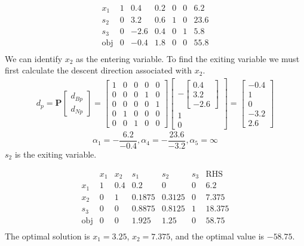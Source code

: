 \documentclass[11pt]{article}
\begin{document}
\begin{center}
\begin{center}
\[\begin{array}{c|ccccc|c}
      x_1 & 1 & 0.4 & 0.2 & 0 & 0 & 6.2 \\
      s_2 & 0 & 3.2 & 0.6 & 1 & 0 & 23.6 \\
      s_3 & 0 & -2.6 & 0.4 & 0 & 1 & 5.8 \\
      \hline
      \text{obj} & 0 & -0.4 & 1.8 & 0 & 0 & 55.8 \\
    \end{array}
    \]
    We can identify $x_2$ as the entering variable.
    To find the exiting variable we must first calculate the descent direction associated with $x_2$.
    \begin{align*}
      d_p =\textbf{P}
      \begin{bmatrix}
         d_{Bp} \\ d_{Np}
      \end{bmatrix}
      = 
      \begin{bmatrix}
        1 & 0 & 0 & 0 & 0 \\
        0 & 0 & 0 & 1 & 0 \\
        0 & 0 & 0 & 0 & 1 \\
        0 & 1 & 0 & 0 & 0 \\
        0 & 0 & 1 & 0 & 0
      \end{bmatrix}
      \begin{bmatrix}
        -
        \begin{bmatrix}
          0.4 \\ 3.2 \\ -2.6
        \end{bmatrix} \\
        1 \\ 0
      \end{bmatrix}
      =
      \begin{bmatrix}
        -0.4 \\ 1 \\ 0 \\ -3.2 \\ 2.6
      \end{bmatrix}
    \end{align*}
    \[
      \alpha_1 = -\frac{6.2}{-0.4} , \alpha_4 = -\frac{23.6}{-3.2}, \alpha_5 = \infty
    \]
    $s_2$ is the exiting variable.
    \begin{center}
      \[
      \begin{array}{c|ccccc|c}
        & x_1 & x_2 & s_1 & s_2 & s_3 & \text{RHS} \\
        \hline
        x_1 & 1 & 0.4 & 0.2 & 0 & 0 & 6.2 \\
        x_2 & 0 & 1 & 0.1875 & 0.3125 & 0 & 7.375 \\
        s_3 & 0 & 0 & 0.8875 & 0.8125 & 1 & 18.375 \\
        \hline
        \text{obj} & 0 & 0 & 1.925 & 1.25 & 0 & 58.75 \\
      \end{array}
      \]
      The optimal solution is $x_1 = 3.25$, $x_2 = 7.375$, and the optimal value is $-58.75$.
    \end{center}
  \end{center}
\end{center}
\end{document}

